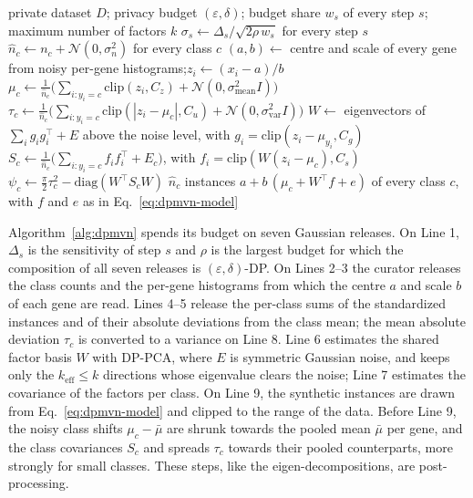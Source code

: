 \documentclass{article}
\newcommand{\dpmvn}{DP-MVN}
\begin{document}
\begin{algorithm}[h]
\caption{\dpmvn{}: differentially private multivariate normal synthetic data}
\label{alg:dpmvn}
\begin{algorithmic}[1]
\Require private dataset $D$; privacy budget $(\varepsilon,\delta)$; budget share $w_s$ of every step $s$; maximum number of factors $k$
\State $\sigma_s \gets \Delta_s / \sqrt{2\rho\, w_s}$ for every step $s$
\State $\hat n_c \gets n_c + \mathcal N(0,\sigma_n^2)$ for every class $c$
\State $(a, b) \gets$ centre and scale of every gene from noisy per-gene histograms;\quad $z_i \gets (x_i - a)/b$
\State $\mu_c \gets \frac{1}{\hat n_c}\big(\sum_{i: y_i = c} \mathrm{clip}(z_i, C_z) + \mathcal N(0, \sigma_\mathrm{mean}^2 I)\big)$
\State $\tau_c \gets \frac{1}{\hat n_c}\big(\sum_{i: y_i = c} \mathrm{clip}(|z_i - \mu_c|, C_u) + \mathcal N(0, \sigma_\mathrm{var}^2 I)\big)$
\State $W \gets$ eigenvectors of $\sum_i g_i g_i^\top + E$ above the noise level, with $g_i = \mathrm{clip}(z_i - \mu_{y_i}, C_g)$
\State $S_c \gets \frac{1}{\hat n_c}\big(\sum_{i: y_i = c} f_i f_i^\top + E_c\big)$, with $f_i = \mathrm{clip}(W(z_i - \mu_c), C_s)$
\State $\psi_c \gets \frac{\pi}{2}\tau_c^2 - \mathrm{diag}(W^\top S_c W)$
\State \Return $\hat n_c$ instances $a + b\,(\mu_c + W^\top f + e)$ of every class $c$, with $f$ and $e$ as in Eq.~\eqref{eq:dpmvn-model}
\end{algorithmic}
\end{algorithm}

Algorithm~\ref{alg:dpmvn} spends its budget on seven Gaussian releases. On Line 1, $\Delta_s$ is the sensitivity of step $s$ and $\rho$ is the largest budget for which the composition of all seven releases is $(\varepsilon,\delta)$-DP. On Lines 2--3 the curator releases the class counts and the per-gene histograms from which the centre $a$ and scale $b$ of each gene are read. Lines 4--5 release the per-class sums of the standardized instances and of their absolute deviations from the class mean; the mean absolute deviation $\tau_c$ is converted to a variance on Line 8. Line 6 estimates the shared factor basis $W$ with DP-PCA, where $E$ is symmetric Gaussian noise, and keeps only the $k_\mathrm{eff}\le k$ directions whose eigenvalue clears the noise; Line 7 estimates the covariance of the factors per class. On Line 9, the synthetic instances are drawn from Eq.~\eqref{eq:dpmvn-model} and clipped to the range of the data. Before Line 9, the noisy class shifts $\mu_c - \bar\mu$ are shrunk towards the pooled mean $\bar\mu$ per gene, and the class covariances $S_c$ and spreads $\tau_c$ towards their pooled counterparts, more strongly for small classes. These steps, like the eigen-decompositions, are post-processing.
\end{document}
